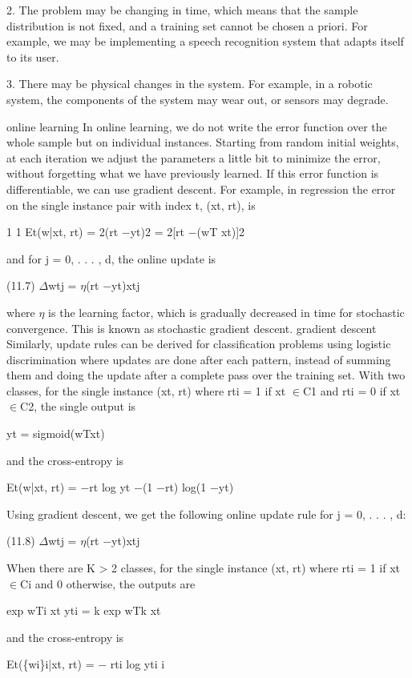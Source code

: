 2. The problem may be changing in time, which means that the sample distribution is not fixed, and a training set cannot be chosen a priori. For example, we may be implementing a speech recognition system that adapts itself to its user.

3. There may be physical changes in the system. For example, in a robotic system, the components of the system may wear out, or sensors may degrade.

online learning In online learning, we do not write the error function over the whole sample but on individual instances. Starting from random initial weights, at each iteration we adjust the parameters a little bit to minimize the error, without forgetting what we have previously learned. If this error function is differentiable, we can use gradient descent. For example, in regression the error on the single instance pair with index t, (xt, rt), is

1 1 Et(w|xt, rt) = 2(rt $-$yt)2 = 2[rt $-$(wT xt)]2

and for j = 0, . . . , d, the online update is

(11.7) $\Delta$wtj = $\eta$(rt $-$yt)xtj

where $\eta$ is the learning factor, which is gradually decreased in time for stochastic convergence. This is known as stochastic gradient descent. gradient descent Similarly, update rules can be derived for classification problems using logistic discrimination where updates are done after each pattern, instead of summing them and doing the update after a complete pass over the training set. With two classes, for the single instance (xt, rt) where rti = 1 if xt $\in$C1 and rti = 0 if xt $\in$C2, the single output is

yt = sigmoid(wTxt)

and the cross-entropy is

Et(w|xt, rt) = $-$rt log yt $-$(1 $-$rt) log(1 $-$yt)

Using gradient descent, we get the following online update rule for j = 0, . . . , d:

(11.8) $\Delta$wtj = $\eta$(rt $-$yt)xtj

When there are K > 2 classes, for the single instance (xt, rt) where rti = 1 if xt $\in$Ci and 0 otherwise, the outputs are

exp wTi xt yti = k exp wTk xt

and the cross-entropy is

Et(\{wi\}i|xt, rt) = $-$ rti log yti i

